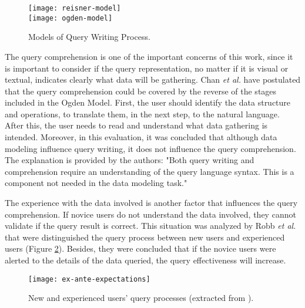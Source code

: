 \begin{figure}[htbp]
  \centering
    {\texttt{[image: reisner-model]}}%
    \\
    {\texttt{[image: ogden-model]}}%
\caption{Models of Query Writing Process.}
  \label{fig:models_of_query_writing_process}
\end{figure}

The query comprehension is one of the important concerns of this work, since it is important to consider if the query representation, no matter if it is visual or textual, indicates clearly what data will be gathering. %
Chan \textit{et al.} \cite{anEvaluationOfNoviceEndUserComputingPerformance} have postulated that the query comprehension could be covered by the reverse of the stages included in the Ogden Model. First, the user should identify the data structure and operations, to translate them, in the next step, to the natural language. After this, the user needs to read and understand what data gathering is intended. Moreover, in this evaluation, it was concluded that although data modeling influence query writing, it does not influence the query comprehension. The explanation is provided by the authors: "Both query writing and comprehension require an understanding of the query language syntax. This is a component not needed in the data modeling task."

The experience with the data involved is another factor that influences the query comprehension. If novice users do not understand the data involved, they cannot validate if the query result is correct. This situation was analyzed by Robb \textit{et al.} that were distinguished the query process between new users and experienced users (Figure \ref{fig:ex_ante_expectations}). Besides, they were concluded that if the novice users were alerted to the details of the data queried, the query effectiveness will increase.

\begin{figure}[htbp]
  \centering
    {\texttt{[image: ex-ante-expectations]}}%
\caption{New and experienced users’ query processes (extracted from \cite{improvingNewUsersQueryPerformance}).}
  \label{fig:ex_ante_expectations}
\end{figure}


